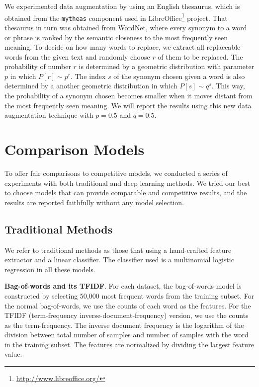 \documentclass{article} \usepackage{nips15submit_e,times}
\begin{document}
We experimented data augmentation by using an English thesaurus, which is obtained from the \texttt{mytheas} component used in LibreOffice\footnote{\url{http://www.libreoffice.org/}} project. That thesaurus in turn was obtained from WordNet\cite{F05}, where every synonym to a word or phrase is ranked by the semantic closeness to the most frequently seen meaning. To decide on how many words to replace, we extract all replaceable words from the given text and randomly choose \(r\) of them to be replaced. The probability of number \(r\) is determined by a geometric distribution with parameter \(p\) in which \(P[r] \sim p^r\). The index \(s\) of the synonym chosen given a word is also determined by a another geometric distribution in which \(P[s] \sim q^s\). This way, the probability of a synonym chosen becomes smaller when it moves distant from the most frequently seen meaning. We will report the results using this new data augmentation technique with \(p = 0.5\) and \(q = 0.5\).

\section{Comparison Models}

To offer fair comparisons to competitive models, we conducted a series of experiments with both traditional and deep learning methods. We tried our best to choose models that can provide comparable and competitive results, and the results are reported faithfully without any model selection.

\subsection{Traditional Methods}

We refer to traditional methods as those that using a hand-crafted feature extractor and a linear classifier. The classifier used is a multinomial logistic regression in all these models.

\textbf{Bag-of-words and its TFIDF}. For each dataset, the bag-of-words model is constructed by selecting 50,000 most frequent words from the training subset. For the normal bag-of-words, we use the counts of each word as the features. For the TFIDF (term-frequency inverse-document-frequency)\cite{J72} version, we use the counts as the term-frequency. The inverse document frequency is the logarithm of the division between total number of samples and number of samples with the word in the training subset. The features are normalized by dividing the largest feature value.
\end{document}

